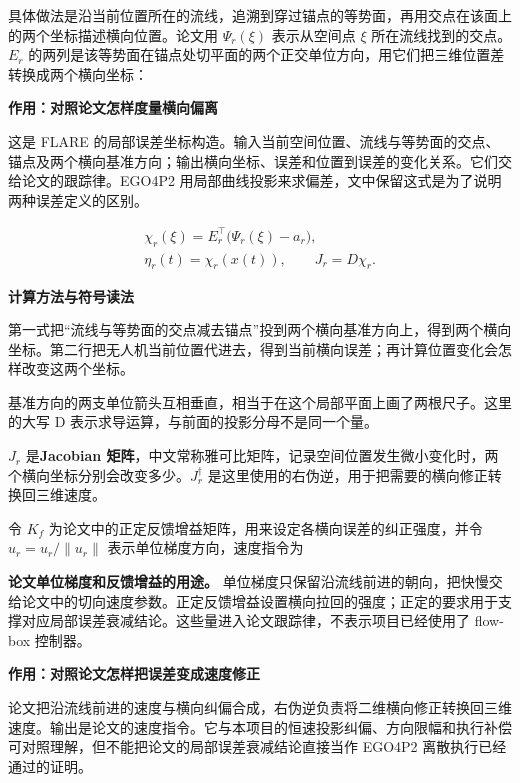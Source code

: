 \documentclass[12pt,a4paper]{article}
\numberwithin{equation}{topic}
\begin{document}
具体做法是沿当前位置所在的流线，追溯到穿过锚点的等势面，再用交点在该面上的两个坐标描述横向位置。论文用 \(\Psi_r(\xi)\) 表示从空间点 \(\xi\) 所在流线找到的交点。\(E_r\) 的两列是该等势面在锚点处切平面的两个正交单位方向，用它们把三维位置差转换成两个横向坐标：

\noindent\textbf{作用：对照论文怎样度量横向偏离}\par\nobreak
这是 FLARE 的局部误差坐标构造。输入当前空间位置、流线与等势面的交点、锚点及两个横向基准方向；输出横向坐标、误差和位置到误差的变化关系。它们交给论文的跟踪律。EGO4P2 用局部曲线投影来求偏差，文中保留这式是为了说明两种误差定义的区别。

\begin{equation}
\label{eq:flow-box}
\begin{gathered}
\chi_r(\xi)=E_r^\top\bigl(\Psi_r(\xi)-a_r\bigr),\qquad\\
\eta_r(t)=\chi_r(x(t)),\qquad J_r=D\chi_r.
\end{gathered}
\end{equation}

\noindent\textbf{计算方法与符号读法}\par\nobreak
第一式把“流线与等势面的交点减去锚点”投到两个横向基准方向上，得到两个横向坐标。第二行把无人机当前位置代进去，得到当前横向误差；再计算位置变化会怎样改变这两个坐标。

基准方向的两支单位箭头互相垂直，相当于在这个局部平面上画了两根尺子。这里的大写 D 表示求导运算，与前面的投影分母不是同一个量。


\(J_r\) 是\textbf{Jacobian 矩阵}，中文常称雅可比矩阵，记录空间位置发生微小变化时，两个横向坐标分别会改变多少。\(J_r^\dagger\) 是这里使用的右伪逆，用于把需要的横向修正转换回三维速度。

令 \(K_f\) 为论文中的正定反馈增益矩阵，用来设定各横向误差的纠正强度，并令 \(\hat u_r=u_r/\|u_r\|\) 表示单位梯度方向，速度指令为

\textbf{论文单位梯度和反馈增益的用途。} 单位梯度只保留沿流线前进的朝向，把快慢交给论文中的切向速度参数。正定反馈增益设置横向拉回的强度；正定的要求用于支撑对应局部误差衰减结论。这些量进入论文跟踪律，不表示项目已经使用了 flow-box 控制器。

\noindent\textbf{作用：对照论文怎样把误差变成速度修正}\par\nobreak
论文把沿流线前进的速度与横向纠偏合成，右伪逆负责将二维横向修正转换回三维速度。输出是论文的速度指令。它与本项目的恒速投影纠偏、方向限幅和执行补偿可对照理解，但不能把论文的局部误差衰减结论直接当作 EGO4P2 离散执行已经通过的证明。
\end{document}
